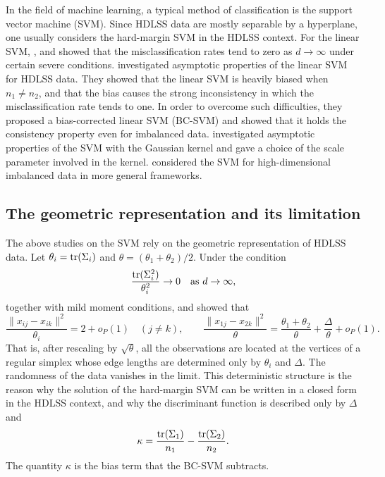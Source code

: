 In the field of machine learning, a typical method of classification is the support
vector machine (SVM). Since HDLSS data are mostly separable by a hyperplane, one
usually considers the hard-margin SVM in the HDLSS context. For the linear SVM,
\citet{hall2005}, \citet{chan2009} and \citet{qiao2015} showed that the
misclassification rates tend to zero as $d\to\infty$ under certain severe conditions.
\citet{nakayama2017} investigated asymptotic properties of the linear SVM for HDLSS
data. They showed that the linear SVM is heavily biased when $n_1\neq n_2$, and that
the bias causes the strong inconsistency in which the misclassification rate tends to
one. In order to overcome such difficulties, they proposed a bias-corrected linear
SVM (BC-SVM) and showed that it holds the consistency property even for imbalanced
data. \citet{nakayama2020} investigated asymptotic properties of the SVM with the
Gaussian kernel and gave a choice of the scale parameter involved in the kernel.
\citet{nakayama2021,nakayama2022} considered the SVM for high-dimensional imbalanced
data in more general frameworks.

\subsection{The geometric representation and its limitation}

The above studies on the SVM rely on the geometric representation of HDLSS data.
Let $\theta_i=\operatorname{tr}(\Sigma_i)$ and $\theta=(\theta_1+\theta_2)/2$. Under the condition
\begin{equation}
\frac{\operatorname{tr}(\Sigma_i^2)}{\theta_i^2}\to 0
\quad\text{as }d\to\infty,
\label{eq:1.2}
\end{equation}
together with mild moment conditions, \citet{hall2005} and \citet{ahn2007} showed that
\[
\frac{\|x_{ij}-x_{ik}\|^2}{\theta_i}=2+o_P(1)\quad(j\neq k),
\qquad
\frac{\|x_{1j}-x_{2k}\|^2}{\theta}
=\frac{\theta_1+\theta_2}{\theta}+\frac{\Delta}{\theta}+o_P(1).
\]
That is, after rescaling by $\sqrt{\theta}$, all the observations are located at the
vertices of a regular simplex whose edge lengths are determined only by $\theta_i$
and $\Delta$. The randomness of the data vanishes in the limit. This deterministic
structure is the reason why the solution of the hard-margin SVM can be written in a
closed form in the HDLSS context, and why the discriminant function is described only
by $\Delta$ and
\begin{equation}
\kappa=\frac{\operatorname{tr}(\Sigma_1)}{n_1}-\frac{\operatorname{tr}(\Sigma_2)}{n_2}.
\label{eq:1.3}
\end{equation}
The quantity $\kappa$ is the bias term that the BC-SVM subtracts.

